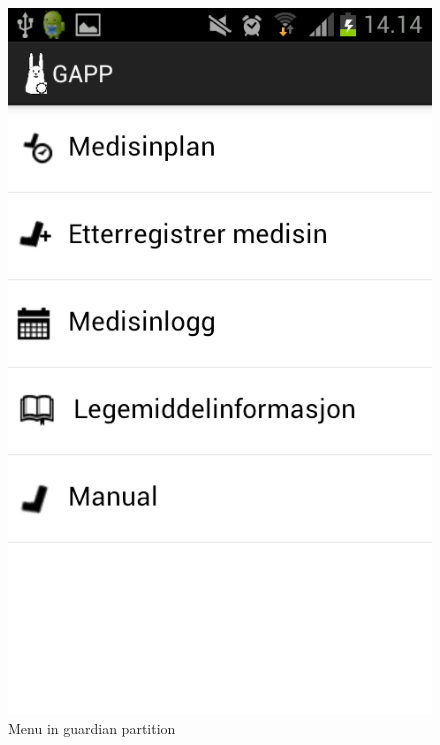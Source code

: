 \begin{figure}
	\begin{minipage}[b]{0.3\linewidth}
		\centering
		\includegraphics[width=0.20\paperwidth]{Pictures/app-screenshots/gapp_main_menu.png}
		\caption{Menu in guardian partition}
		\label{fig:gapp-main-menu}
	\end{minipage}
	\begin{minipage}[b]{0.3\linewidth}
		\centering

\end{minipage}
\end{figure}
